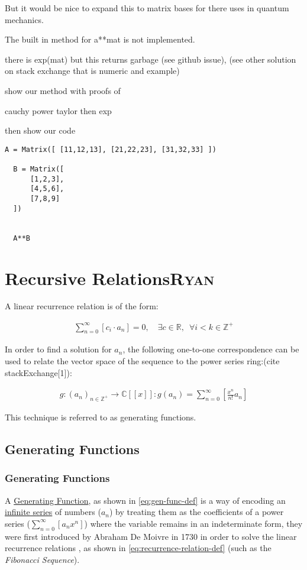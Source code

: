\documentclass[11pt]{article}
\begin{document}
But it would be nice to expand this to matrix bases for there uses in quantum
mechanics.

The built in method for a**mat is not implemented.

there is exp(mat) but this returns garbage (see github issue), (see other
solution on stack exchange that is numeric and example)

show our method with proofs of

cauchy power taylor then exp

then show our code

\begin{verbatim}
A = Matrix([ [11,12,13], [21,22,23], [31,32,33] ])

  B = Matrix([
      [1,2,3],
      [4,5,6],
      [7,8,9]
  ])


  A**B
\end{verbatim}
\section[Recursive Relations]{Recursive Relations\hfill{}\textsc{Ryan}}
\label{sec:org187decc}
A linear recurrence relation is of the form:

\begin{align}
\sum^{\infty}_{n= 0}   \left[ c_i \cdot  a_n \right] = 0, \quad \exists c \in
\mathbb{R}, \enspace \forall i<k\in\mathbb{Z}^+ \label{eq:recurrence-relation-def}
\end{align}

In order to find a solution for \(a_n\), the following one-to-one
correspondence can be used to relate the vector space of the sequence to the
power series ring:(cite stackExchange[1]):

\begin{align}
g: \left( a_n \right)_{n\in\mathbb{Z}^+} \rightarrow \mathbb{C}\left[ \left[ x \right]  \right]: g\left( a_n \right) = \sum^{\infty}_{n= 0}\left[ \frac{x^n}{n!} a_n \right] \label{eq:gen-func-def}
\end{align}

This technique is referred to as generating functions.
\cite{lehmanReadingsMathematicsComputer2010}


\subsection{Generating Functions}
\label{sec:org739ccfe}
\subsubsection{Generating Functions}
\label{sec:org200f07c}
A \href{https://en.wikipedia.org/wiki/Generating\_function}{Generating Function}, as shown in \eqref{eq:gen-func-def}  is a way of encoding an \href{https://en.wikipedia.org/wiki/Infinite\_sequence}{infinite series} of numbers (\(a_n\))
by treating them as the coefficients of a power series (\(\sum^\infty_{n = 0}
\left[ a_nx^n \right]\)) where the variable remains in an indeterminate form,
they were first introduced by Abraham De Moivre in 1730 in order to solve the
linear recurrence relations \cite{knuthArtComputerProgramming1997}, as shown in \eqref{eq:recurrence-relation-def} (such as the \emph{Fibonacci Sequence}).
\end{document}
